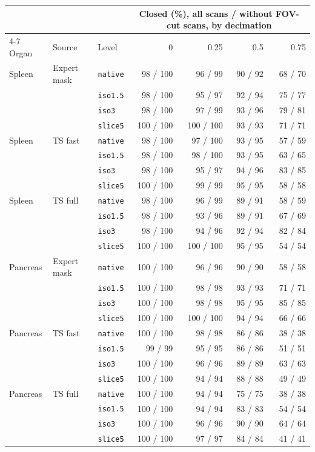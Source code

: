 \begin{tabular}{lllrrrr}
\toprule
& & & \multicolumn{4}{c}{Closed (\%), all scans / without FOV-cut scans, by decimation} \\
\cmidrule(lr){4-7}
Organ & Source & Level & 0 & 0.25 & 0.5 & 0.75 \\
\midrule
Spleen & Expert mask & \texttt{native} & 98 / 100 & 96 / 99 & 90 / 92 & 68 / 70 \\
 &  & \texttt{iso1.5} & 98 / 100 & 95 / 97 & 92 / 94 & 75 / 77 \\
 &  & \texttt{iso3} & 98 / 100 & 97 / 99 & 93 / 96 & 79 / 81 \\
 &  & \texttt{slice5} & 100 / 100 & 100 / 100 & 93 / 93 & 71 / 71 \\
\midrule
Spleen & TS fast & \texttt{native} & 98 / 100 & 97 / 100 & 93 / 95 & 57 / 59 \\
 &  & \texttt{iso1.5} & 98 / 100 & 98 / 100 & 93 / 95 & 63 / 65 \\
 &  & \texttt{iso3} & 98 / 100 & 95 / 97 & 94 / 96 & 83 / 85 \\
 &  & \texttt{slice5} & 100 / 100 & 99 / 99 & 95 / 95 & 58 / 58 \\
\midrule
Spleen & TS full & \texttt{native} & 98 / 100 & 96 / 99 & 89 / 91 & 58 / 59 \\
 &  & \texttt{iso1.5} & 98 / 100 & 93 / 96 & 89 / 91 & 67 / 69 \\
 &  & \texttt{iso3} & 98 / 100 & 94 / 96 & 92 / 94 & 82 / 84 \\
 &  & \texttt{slice5} & 100 / 100 & 100 / 100 & 95 / 95 & 54 / 54 \\
\midrule
Pancreas & Expert mask & \texttt{native} & 100 / 100 & 96 / 96 & 90 / 90 & 58 / 58 \\
 &  & \texttt{iso1.5} & 100 / 100 & 98 / 98 & 93 / 93 & 71 / 71 \\
 &  & \texttt{iso3} & 100 / 100 & 98 / 98 & 95 / 95 & 85 / 85 \\
 &  & \texttt{slice5} & 100 / 100 & 100 / 100 & 94 / 94 & 66 / 66 \\
\midrule
Pancreas & TS fast & \texttt{native} & 100 / 100 & 98 / 98 & 86 / 86 & 38 / 38 \\
 &  & \texttt{iso1.5} & 99 / 99 & 95 / 95 & 86 / 86 & 51 / 51 \\
 &  & \texttt{iso3} & 100 / 100 & 96 / 96 & 89 / 89 & 63 / 63 \\
 &  & \texttt{slice5} & 100 / 100 & 94 / 94 & 88 / 88 & 49 / 49 \\
\midrule
Pancreas & TS full & \texttt{native} & 100 / 100 & 94 / 94 & 75 / 75 & 38 / 38 \\
 &  & \texttt{iso1.5} & 100 / 100 & 94 / 94 & 83 / 83 & 54 / 54 \\
 &  & \texttt{iso3} & 100 / 100 & 96 / 96 & 90 / 90 & 64 / 64 \\
 &  & \texttt{slice5} & 100 / 100 & 97 / 97 & 84 / 84 & 41 / 41 \\
\bottomrule
\end{tabular}
